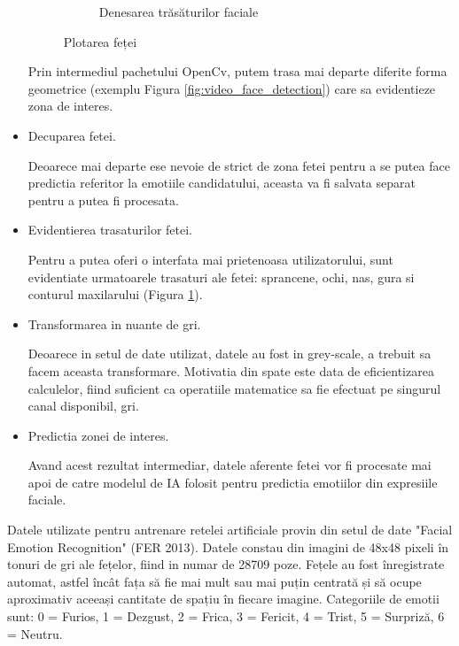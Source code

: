 \documentclass[a4paper, 12pt]{report}
\begin{document}
\begin{itemize}
\begin{figure}[H]
\begin{subfigure}[b]{0.425\textwidth}
				\caption{Denesarea trăsăturilor faciale}
				\label{fig:video_face_features}
			\end{subfigure}
			\caption{Plotarea feței}
			\label{fig:face}
		\end{figure}
	
		Prin intermediul pachetului OpenCv, putem trasa mai departe diferite forma geometrice (exemplu Figura \ref{fig:video_face_detection}) care sa evidentieze zona de interes.
		
		\item Decuparea fetei.
		
		Deoarece mai departe ese nevoie de strict de zona fetei pentru a se putea face predictia referitor la emotiile candidatului, aceasta va fi salvata separat pentru a putea fi procesata. 
		
		\item Evidentierea trasaturilor fetei.
		
		Pentru a putea oferi o interfata mai prietenoasa utilizatorului, sunt evidentiate urmatoarele trasaturi ale fetei: sprancene, ochi, nas, gura si conturul maxilarului (Figura \ref{fig:video_face_features}). 
		
		\item Transformarea in nuante de gri.
		
		Deoarece in setul de date utilizat, datele au fost in grey-scale, a trebuit sa facem aceasta transformare. Motivatia din spate este data de eficientizarea calculelor, fiind suficient ca operatiile matematice sa fie efectuat pe singurul canal disponibil, gri.
		
		\item Predictia zonei de interes.
		
		Avand acest rezultat intermediar, datele aferente fetei vor fi procesate mai apoi de catre modelul de IA folosit pentru predictia emotiilor din expresiile faciale.
		
	\end{itemize}
	
	Datele utilizate pentru antrenare retelei artificiale provin din setul de date "Facial Emotion Recognition" (FER 2013). Datele constau din imagini de 48x48 pixeli în tonuri de gri ale fețelor, fiind in numar de 28709 poze. Fețele au fost înregistrate automat, astfel încât fața să fie mai mult sau mai puțin centrată și să ocupe aproximativ aceeași cantitate de spațiu în fiecare imagine. Categoriile de emotii sunt: 0 = Furios, 1 = Dezgust, 2 = Frica, 3 = Fericit, 4 = Trist, 5 = Surpriză, 6 = Neutru.
	
\end{document}
